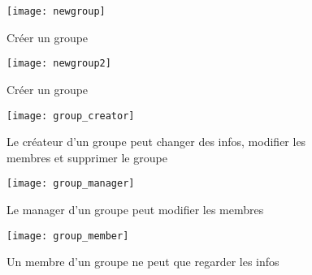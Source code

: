 \begin{figure}[H]
\centering
\texttt{[image: newgroup]}
\caption{Créer un groupe}
\end{figure}

\begin{figure}[H]
\centering
\texttt{[image: newgroup2]}
\caption{Créer un groupe}
\end{figure}

\begin{figure}[H]
\centering
\texttt{[image: group\_creator]}
\caption{Le créateur d'un groupe peut changer des infos, modifier les membres et supprimer le groupe}
\end{figure}

\begin{figure}[H]
\centering
\texttt{[image: group\_manager]}
\caption{Le manager d'un groupe peut modifier les membres}
\end{figure}

\begin{figure}[H]
\centering
\texttt{[image: group\_member]}
\caption{Un membre d'un groupe ne peut que regarder les infos}
\end{figure}